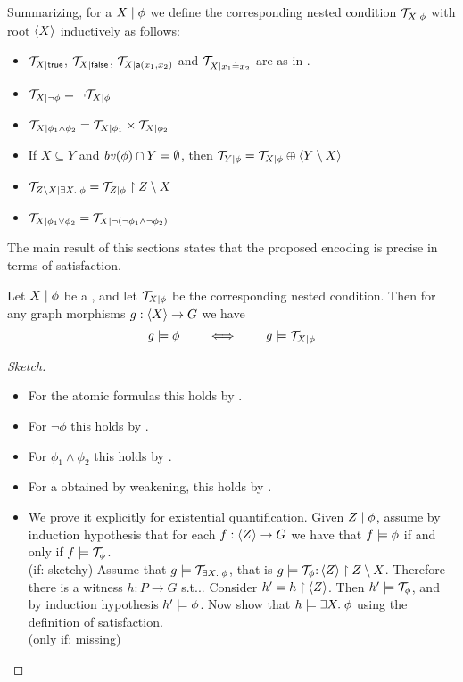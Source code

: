 Summarizing, for a {\cfor} ${X} \mid {\phi}$ we define the corresponding nested condition ${\mathcal{T}}_{{X} \mid {\phi}}$ with root $\langle X\rangle$ inductively as follows:

\begin{itemize}
	\item ${\mathcal{T}}_{{X} \mid {\mathsf{true}}}$, ${\mathcal{T}}_{{X} \mid {\mathsf{false}}}$, ${\mathcal{T}}_{{X} \mid {\mathsf{a}(x_1,x_2)}}$ and ${\mathcal{T}}_{{X} \mid {x_1\mathbin{\doteq}x_2}}$ are as in . 
	\item  ${\mathcal{T}}_{{X} \mid {\neg \phi}} = \neg {\mathcal{T}}_{{X} \mid {\phi}}$
	\item  ${\mathcal{T}}_{{X} \mid {\phi_1 \wedge \phi_2}} = {\mathcal{T}}_{{X} \mid {\phi_1}} \times {\mathcal{T}}_{{X} \mid {\phi_2}}$
	\item If $X \subseteq Y$ and $\mathit{bv}(\phi)\cap Y = \emptyset$, then ${\mathcal{T}}_{{Y} \mid {\phi}} =  {\mathcal{T}}_{{X} \mid {\phi}} \oplus \langle Y\setminus X\rangle$
	\item ${\mathcal{T}}_{{Z \setminus X} \mid {\exists X.\;\phi}} = {\mathcal{T}}_{{Z} \mid {\phi}} \restriction Z\setminus X$
	\item ${\mathcal{T}}_{{X} \mid {\phi_1 \vee \phi_2}} = {\mathcal{T}}_{{X} \mid {\neg( \neg \phi_1 \wedge \neg \phi_2)}}$
\end{itemize}

The main result of this sections states that the proposed encoding is precise in terms of satisfaction. 
\begin{proposition}
	Let ${X} \mid {\phi}$ be a {\cfor}, and let ${\mathcal{T}}_{{X} \mid {\phi}}$ be the corresponding nested condition. Then for any graph morphisms $g: \langle X\rangle \rightarrow G$ we have
	$$ g \models \phi \qquad \iff \qquad g \models {\mathcal{T}}_{{X} \mid {\phi}} $$
\end{proposition}
\begin{proof}[Sketch]
	\begin{itemize}
	\item For the atomic formulas this holds by .
	\item For $\neg \phi$ this holds by .
	
	\item For $\phi_1 \wedge \phi_2$ this holds by .
	\item For a {\cfor} obtained by weakening, this holds by .
	\item We prove it explicitly for existential quantification. Given ${Z} \mid {\phi}$, assume by induction hypothesis that for each $f: \langle Z\rangle \rightarrow G$ we have that  $f \models \phi$ if and only if $f \models {\mathcal{T}}_\phi$. \\
	(if: sketchy) Assume that  $g \models {\mathcal{T}}_{\exists X.\; \phi}$, that is $g \models {\mathcal{T}}_{\phi}{:}\,\langle Z\rangle \restriction Z\setminus X$. Therefore there is a witness $h: P \to G$ s.t... Consider $h' = h \restriction \langle Z\rangle$. Then $h' \models {\mathcal{T}}_\phi$, and by induction hypothesis $h' \models \phi$.
	Now show that $h \models \exists X.\; \phi$ using the definition of satisfaction.\\
	(only if: missing)
\end{itemize}


\end{proof}

